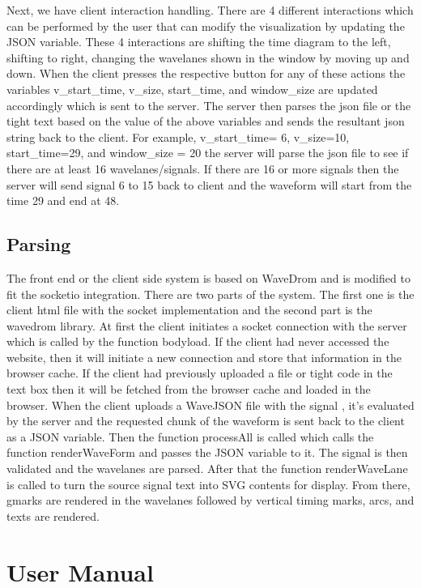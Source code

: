 \documentclass[14pt]{extarticle}
\begin{document}
 Next, we have client interaction handling. There are 4 different interactions which can be performed by the user that can modify the visualization by updating the JSON variable. These 4 interactions are shifting the time diagram to the left, shifting to right, changing the wavelanes shown in the window by moving up and down. When the client presses the respective button for any of these actions the variables v\_start\_time, v\_size, start\_time, and window\_size are updated accordingly which is sent to the server. The server then parses the json file or the tight text based on the value of the above variables and sends the resultant json string back to the client. For example, v\_start\_time= 6, v\_size=10, start\_time=29, and window\_size = 20 the server will parse the json file to see if there are at least 16 wavelanes/signals. If there are 16 or more signals then the server will send signal 6 to 15 back to client and the waveform will start from the time 29 and end at 48.

\subsection{Parsing}
 The front end or the client side system is based on WaveDrom and is modified to fit the socketio integration. There are two parts of the system. The first one is the client html file with the socket implementation and the second part is the wavedrom library. At first the client initiates a socket connection with the server which is called by the function bodyload. 
 If the client had never accessed the website, then it will initiate a new connection and store that information in the browser cache. If the client had previously uploaded a file or tight code in the text box then it will be fetched from the browser cache and loaded in the browser. When the client uploads a WaveJSON file with the signal , it’s evaluated by the server and the requested chunk of the waveform is sent back to the client as a JSON variable. Then the function processAll is called which calls the function renderWaveForm and passes the JSON variable to it. The signal is then validated and the wavelanes are parsed. After that the function renderWaveLane is called to turn the source signal text into SVG contents for display. From there, gmarks are rendered in the  wavelanes followed by vertical timing marks, arcs, and texts are rendered.

\section{User Manual}
\end{document}
